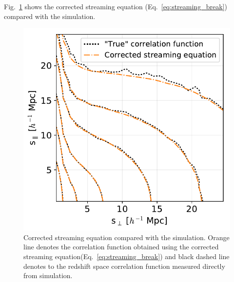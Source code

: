 \documentclass[a4paper,fleqn,usenatbib]{mnras}
\begin{document}
	\noindent  Fig.~\ref{fig:new_str} shows the corrected streaming equation (Eq.~\ref{eq:streaming_break}) compared with the simulation.
	
	
	\begin{figure}
		\centering
		\includegraphics[scale=0.72]{correctedvstrue}
		\caption{Corrected streaming equation compared with the simulation. Orange line denotes the correlation function obtained using the corrected streaming equation(Eq.~\ref{eq:streaming_break}) and black dashed line denotes to the redshift space correlation function measured directly from simulation.}
		\label{fig:new_str}
	\end{figure}
\end{document}
